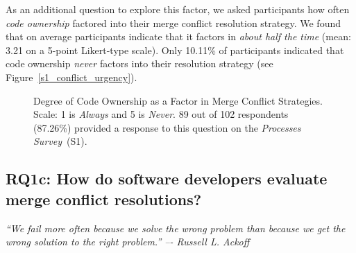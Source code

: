 As an additional question to explore this factor, we asked participants how often \textit{code ownership} factored into their merge conflict resolution strategy.
We found that on average participants indicate that it factors in \textit{about half the time} (mean: 3.21 on a 5-point Likert-type scale).
Only 10.11\% of participants indicated that code ownership \textit{never} factors into their resolution strategy (see Figure~\ref{s1_conflict_urgency}).

\begin{figure}[!htbp]
\centering
{}
\caption{Degree of Code Ownership as a Factor in Merge Conflict Strategies. Scale: 1 is \textit{Always} and 5 is \textit{Never}. 89 out of 102 respondents (87.26\%) provided a response to this question on the \textit{Processes Survey}~(S1).}
\label{model}
\end{figure}

\subsection{\textbf{RQ1c:} How do software developers evaluate merge conflict resolutions?}\label{RQ1c}
\vspace*{-0.5\baselineskip}
\begin{quoting}
\textit{``We fail more often because we solve the wrong problem than because we get the wrong solution to the right problem.'' –- Russell L. Ackoff}
\end{quoting}
\vspace*{+0.3\baselineskip}

